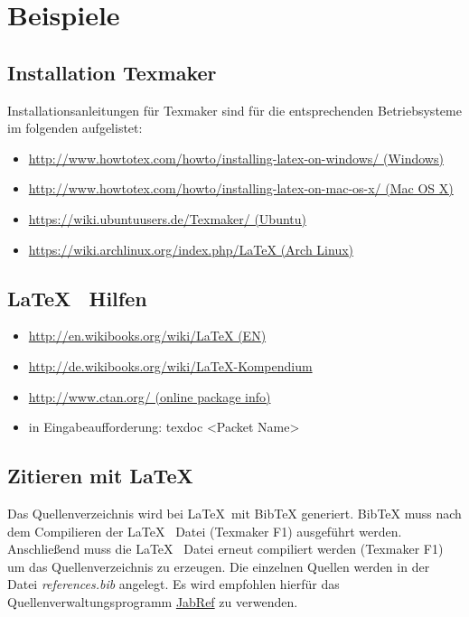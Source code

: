 \documentclass[SSS_Laborbericht.tex]{subfiles}
\begin{document}
\chapter{Beispiele}
\label{chap:EINL}
\pagestyle{plain}

\section{Installation Texmaker}
Installationsanleitungen für Texmaker sind für die entsprechenden Betriebsysteme im folgenden aufgelistet:
\begin{itemize}
	\item \href{http://www.howtotex.com/howto/installing-latex-on-windows/}{http://www.howtotex.com/howto/installing-latex-on-windows/ (Windows)}
	\item \href{http://www.howtotex.com/howto/installing-latex-on-mac-os-x/}{http://www.howtotex.com/howto/installing-latex-on-mac-os-x/ (Mac OS X)}
	\item \href{https://wiki.ubuntuusers.de/Texmaker/}{https://wiki.ubuntuusers.de/Texmaker/ (Ubuntu)}
	\item \href{https://wiki.archlinux.org/index.php/LaTeX}{https://wiki.archlinux.org/index.php/LaTeX (Arch Linux)}
\end{itemize}


\section{\LaTeX ~ Hilfen}
\begin{itemize}
  \item \href{http://en.wikibooks.org/wiki/LaTeX}{http://en.wikibooks.org/wiki/LaTeX (EN)}
  \item \href{http://de.wikibooks.org/wiki/LaTeX-Kompendium}{http://de.wikibooks.org/wiki/LaTeX-Kompendium}
  \item \href{http://www.ctan.org/}{http://www.ctan.org/ (online package info)}
  \item in Eingabeaufforderung: texdoc <Packet Name>
\end{itemize}
\newpage

\section{Zitieren mit \LaTeX}
Das Quellenverzeichnis wird bei \LaTeX ~mit BibTeX generiert. BibTeX muss nach dem Compilieren der \LaTeX~ Datei (Texmaker F1) ausgeführt werden. Anschließend muss die \LaTeX~ Datei erneut compiliert werden (Texmaker F1) um das Quellenverzeichnis zu erzeugen. Die einzelnen Quellen werden in der Datei \textit{references.bib} angelegt. Es wird empfohlen hierfür das Quellenverwaltungsprogramm \href{http://jabref.sourceforge.net/}{JabRef} zu verwenden.
\end{document}
